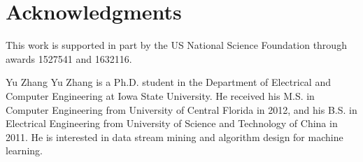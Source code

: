 \documentclass[10pt,journal,compsoc]{IEEEtran}
\begin{document}






\section*{Acknowledgments}
This work is supported in part by the US National Science Foundation through awards 1527541 and 1632116.




%


\begin{IEEEbiography}{Yu Zhang}
Yu Zhang is a Ph.D. student in the Department of Electrical and Computer Engineering at Iowa State University. He received his M.S. in Computer Engineering from University of Central Florida in 2012, and his B.S. in Electrical Engineering from University of Science and Technology of China in 2011. He is interested in data stream mining and algorithm design for machine learning.
\end{IEEEbiography}
\end{document}
